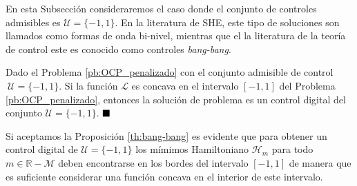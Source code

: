 En esta Subsección consideraremos el caso donde el conjunto de controles admisibles es $\mathcal{U}=\{-1,1\}$. En la literatura de SHE, este tipo de soluciones son llamados como formas de onda bi-nivel, mientras que el la literatura de la teoría de control este es conocido como controles \emph{bang-bang}.
\vspace{1em}
\begin{theorem}\label{th:bang-bang}
    Dado el Problema \ref{pb:OCP_penalizado} con el conjunto admisible de control $ \ \mathcal{U} = \{-1,1\}$. Si la función $\mathcal{L}$ es concava en el intervalo $[-1,1]$ del Problema \ref{pb:OCP_penalizado}, entonces la solución de problema es un control digital del conjunto $\mathcal{U} =  \{-1,1\}$.
    $\hfill \blacksquare$
\end{theorem}

Si aceptamos la Proposición \ref{th:bang-bang} es evidente que  para obtener un control digital de $\mathcal{U}=\{-1,1\}$ los mímimos Hamiltoniano $\mathcal{H}_m$ para todo $m\in \mathbb{R}-\mathcal{M}$ deben encontrarse en los bordes del intervalo $[-1,1]$ de manera que es suficiente considerar una función concava en el interior de este intervalo. 

